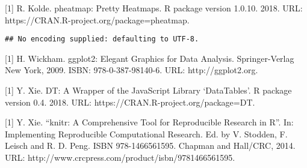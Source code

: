 \documentclass[]{article}
\begin{document}
{[}1{]} R. Kolde. pheatmap: Pretty Heatmaps. R package version 1.0.10.
2018. URL: https://CRAN.R-project.org/package=pheatmap.

\begin{verbatim}
## No encoding supplied: defaulting to UTF-8.
\end{verbatim}

{[}1{]} H. Wickham. ggplot2: Elegant Graphics for Data Analysis.
Springer-Verlag New York, 2009. ISBN: 978-0-387-98140-6. URL:
http://ggplot2.org.

{[}1{]} Y. Xie. DT: A Wrapper of the JavaScript Library `DataTables'. R
package version 0.4. 2018. URL: https://CRAN.R-project.org/package=DT.

{[}1{]} Y. Xie. ``knitr: A Comprehensive Tool for Reproducible Research
in R''. In: Implementing Reproducible Computational Research. Ed. by V.
Stodden, F. Leisch and R. D. Peng. ISBN 978-1466561595. Chapman and
Hall/CRC, 2014. URL: http://www.crcpress.com/product/isbn/9781466561595.
\end{document}
